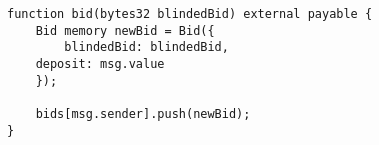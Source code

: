 \begin{lstlisting}[language=Solidity]
function bid(bytes32 blindedBid) external payable {
	Bid memory newBid = Bid({
		blindedBid: blindedBid,
	deposit: msg.value
	});
	
	bids[msg.sender].push(newBid);
}
\end{lstlisting}